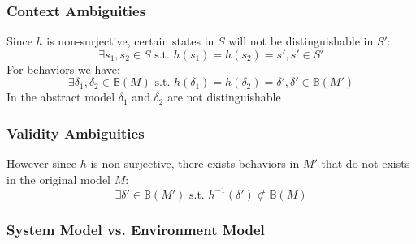 \subsubsection{Context Ambiguities}
Since $h$ is non-surjective, certain states in $S$ will not be distinguishable in $S'$:
$$\exists s_1,s_2\in S \text{ s.t. }h(s_1)=h(s_2)=s',s'\in S'$$
For behaviors we have:
$$\exists \delta_1,\delta_2\in \mathbb{B}(M) \text{ s.t. }h(\delta_1)=h(\delta_2)=\delta',\delta'\in \mathbb{B}(M')$$
In the abstract model $\delta_1$ and $\delta_2$ are not distinguishable
\subsubsection{Validity Ambiguities}
However since $h$ is non-surjective, there exists behaviors in $M'$ that do not exists in the original model $M$:
$$\exists\delta'\in\mathbb{B}(M')\text{ s.t. }h^{-1}(\delta')\not\subset\mathbb{B}(M)$$

\subsubsection{System Model vs. Environment Model}
